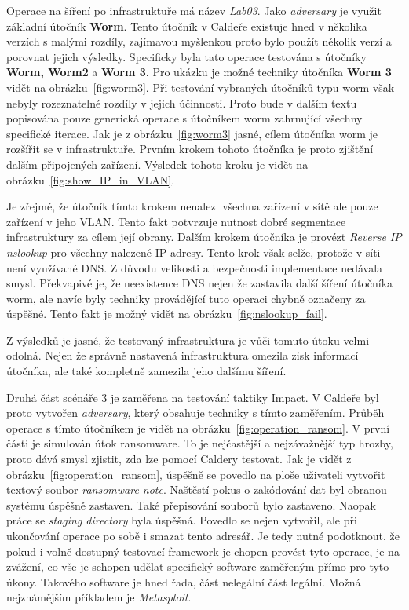Operace na šíření po infrastruktuře má název \textit{Lab03}.
Jako \textit{adversary} je využit základní útočník \textbf{Worm}.
Tento útočník v Caldeře existuje hned v několika verzích s malými rozdíly, zajímavou myšlenkou proto bylo použít několik verzí a porovnat jejich výsledky.
Specificky byla tato operace testována s útočníky \textbf{Worm, Worm2} a \textbf{Worm 3}.
Pro ukázku je možné techniky útočníka \textbf{Worm 3} vidět na obrázku~\ref{fig:worm3}.
Při testování vybraných útočníků typu worm však nebyly rozeznatelné rozdíly v jejich účinnosti.
Proto bude v dalším textu popisována pouze generická operace s útočníkem worm zahrnující všechny specifické iterace.
Jak je z obrázku~\ref{fig:worm3} jasné, cílem útočníka worm je rozšířit se v infrastruktuře.
Prvním krokem tohoto útočníka je proto zjištění dalším připojených zařízení.
Výsledek tohoto kroku je vidět na obrázku~\ref{fig:show_IP_in_VLAN}.


Je zřejmé, že útočník tímto krokem nenalezl všechna zařízení v sítě ale pouze zařízení v jeho \ac{VLAN}.
Tento fakt potvrzuje nutnost dobré segmentace infrastruktury za cílem její obrany.
Dalším krokem útočníka je provézt \textit{Reverse IP nslookup} pro všechny nalezené IP adresy.
Tento krok však selže, protože v síti není využívané \ac{DNS}.
Z důvodu velikosti a bezpečnosti implementace nedávala smysl.
Překvapivé je, že neexistence \ac{DNS} nejen že zastavila další šíření útočníka worm, ale navíc byly techniky provádějící tuto operaci chybně označeny za úspěšné.
Tento fakt je možný vidět na obrázku~\ref{fig:nslookup_fail}.

Z výsledků je jasné, že testovaný infrastruktura je vůči tomuto útoku velmi odolná.
Nejen že správně nastavená infrastruktura omezila zisk informací útočníka, ale také kompletně zamezila jeho dalšímu šíření.

Druhá část scénáře 3 je zaměřena na testování taktiky Impact.
V Caldeře byl proto vytvořen \textit{adversary}, který obsahuje techniky s tímto zaměřením.
Průběh operace s tímto útočníkem je vidět na obrázku~\ref{fig:operation_ransom}.
V první části je simulován útok ransomware.
To je nejčastější a nejzávažnější typ hrozby, proto dává smysl zjistit, zda lze pomocí Caldery testovat.
Jak je vidět z obrázku~\ref{fig:operation_ransom}, úspěšně se povedlo na ploše uživateli vytvořit textový soubor \textit{ransomware note}.
Naštěstí pokus o zakódování dat byl obranou systému úspěšně zastaven.
Také přepisování souborů bylo zastaveno.
Naopak práce se \textit{staging directory} byla úspěšná.
Povedlo se nejen vytvořil, ale při ukončování operace po sobě i smazat tento adresář.
Je tedy nutné podotknout, že pokud i volně dostupný testovací framework je chopen provést tyto operace, je na zvážení, co vše je schopen udělat specifický software zaměřeným přímo pro tyto úkony.
Takového software je hned řada, část nelegální část legální.
Možná nejznámějším příkladem je \textit{Metasploit}\cite{metasploit}.

